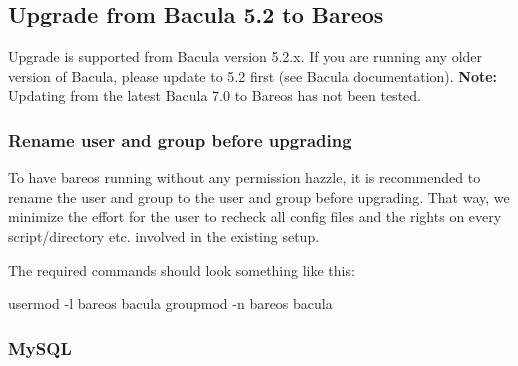\subsection{Upgrade from Bacula 5.2 to Bareos}
\label{upgrade-from-bacula-to-bareos}

Upgrade is supported from Bacula version 5.2.x. If you are running any older version of Bacula, please update to 5.2 first (see Bacula documentation). \textbf{Note:} Updating from the latest Bacula 7.0 to Bareos has not been tested.

\subsubsection{Rename user and group before upgrading}

To have bareos running without any permission hazzle, it is recommended to rename the user and group  to the user and group  before upgrading. That way, we minimize the effort for the user to recheck all config files and the rights on every script/directory etc. involved in the existing setup.

The required commands should look something like this:

\begin{commands}{}
usermod  -l bareos bacula
groupmod -n bareos bacula
\end{commands}

\subsubsection{MySQL}

